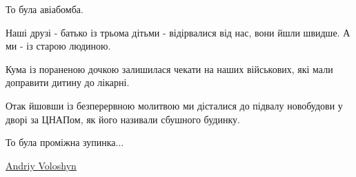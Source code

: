 То була авіабомба.

Наші друзі - батько із трьома дітьми - відірвалися від нас, вони йшли швидше. А
ми - із старою людиною. 

Кума із пораненою дочкою залишилася чекати на наших військових, які мали
доправити дитину до лікарні. 

Отак йшовши із безперервною молитвою ми дісталися до підвалу новобудови у дворі
за ЦНАПом, як його називали сбушного будинку. 

То була проміжна зупинка...

\href{https://www.facebook.com/profile.php?id=100045301456680}{Andriy Voloshyn}

